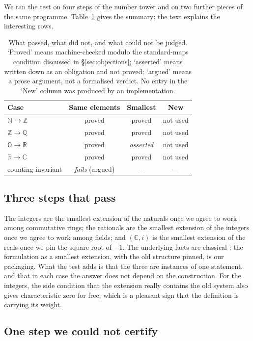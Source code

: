 \documentclass[12pt,a4paper]{article}
\begin{document}
We ran the test on four steps of the number tower and on two further pieces of the
same programme.  Table~\ref{tab:verdicts} gives the summary; the text explains the
interesting rows.

\begin{table}[t]
\centering
\small
\begin{tabular}{@{}lccc@{}}
\toprule
Case & Same elements & Smallest & New \\
\midrule
$\mathbb{N}\to\mathbb{Z}$ & proved & proved & not used \\
$\mathbb{Z}\to\mathbb{Q}$ & proved & proved & not used \\
$\mathbb{Q}\to\mathbb{R}$ & proved & \emph{asserted} & not used \\
$\mathbb{R}\to\mathbb{C}$ & proved & proved & not used \\
counting invariant & \emph{fails} (argued) & --- & --- \\
\bottomrule
\end{tabular}
\caption{What passed, what did not, and what could not be judged.  `Proved' means
machine-checked modulo the standard-maps condition discussed in
\S\ref{sec:objections}; `asserted' means written down as an obligation and not
proved; `argued' means a prose argument, not a formalised verdict.  No entry in
the `New' column was produced by an implementation.}
\label{tab:verdicts}
\end{table}

\subsection{Three steps that pass}

The integers are the smallest extension of the naturals once we agree to work
among commutative rings; the rationals are the smallest extension of the integers
once we agree to work among fields; and $(\mathbb{C},i)$ is the smallest extension
of the reals once we pin the square root of $-1$.  The underlying facts are
classical \citep{ebb}; the formulation as a smallest extension, with the old
structure pinned, is our packaging.  What the test adds is that the three are
instances of one statement, and that in each case the answer does not depend on
the construction.  For the integers, the side condition that the extension really
contains the old system also gives characteristic zero for free, which is a
pleasant sign that the definition is carrying its weight.

\subsection{One step we could not certify}
\end{document}
